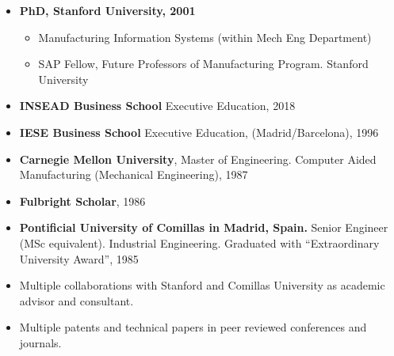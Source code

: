 \documentclass{res}
\begin{document}
\begin{resume}
\begin{itemize}
    \item {\bf PhD, Stanford University, 2001}
    \begin{itemize}
        \item Manufacturing Information Systems (within Mech Eng Department)
        \item SAP Fellow, Future Professors of Manufacturing Program. Stanford University
    \end{itemize}
    \item {\bf INSEAD Business School} Executive Education, 2018
    \item {\bf IESE Business School} Executive Education, (Madrid/Barcelona), 1996
    \item {\bf Carnegie Mellon University}, Master of Engineering. Computer Aided Manufacturing (Mechanical Engineering), 1987
    \item {\bf Fulbright Scholar}, 1986
    \item {\bf Pontificial University of Comillas in Madrid, Spain.} Senior Engineer (MSc equivalent). Industrial Engineering. Graduated with “Extraordinary University Award”, 1985
    \item Multiple collaborations with Stanford and Comillas University as academic advisor and consultant.
    \item Multiple patents and technical papers in peer reviewed conferences and journals.
\end{itemize}

\end{resume}
\end{document}
